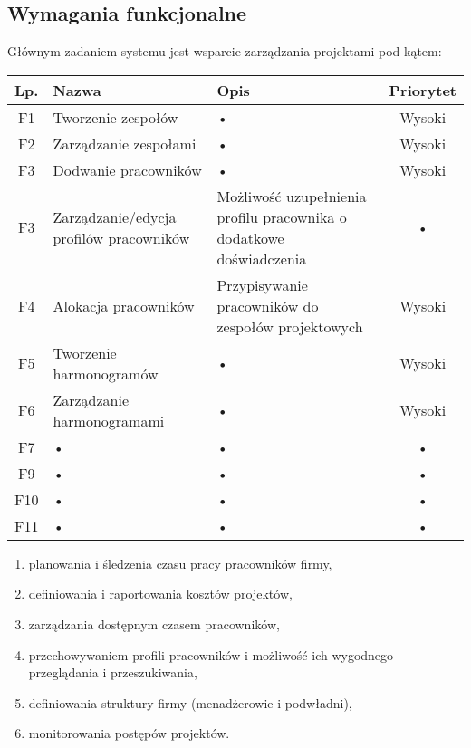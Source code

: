 \subsection{Wymagania funkcjonalne}
Głównym zadaniem systemu jest wsparcie zarządzania projektami pod kątem:

\begin{tabularx}{\textwidth}{|c|X|X|c|}
\hline 
Lp. & Nazwa & Opis & Priorytet \\ 
\hline 
F1 & Tworzenie zespołów & • & Wysoki \\ 
\hline 
F2 & Zarządzanie zespołami & • & Wysoki \\ 
\hline 
F3 & Dodwanie pracowników & • & Wysoki \\ 
\hline 
F3 & Zarządzanie/edycja profilów pracowników & Możliwość uzupełnienia profilu pracownika o dodatkowe doświadczenia & • \\ 
\hline 
F4 & Alokacja pracowników & Przypisywanie pracowników do zespołów projektowych & Wysoki \\ 
\hline 
F5 & Tworzenie harmonogramów & • & Wysoki \\ 
\hline 
F6 & Zarządzanie harmonogramami & • & Wysoki \\ 
\hline 
F7 & • & • & • \\ 
\hline 
F9 & • & • & • \\ 
\hline 
F10 & • & • & • \\ 
\hline 
F11 & • & • & • \\ 
\hline 
\end{tabularx} 
\begin{enumerate}
\item planowania i śledzenia czasu pracy pracowników firmy,
\item definiowania i raportowania kosztów projektów,
\item zarządzania dostępnym czasem pracowników,
\item przechowywaniem profili pracowników i możliwość ich wygodnego przeglądania i przeszukiwania,
\item definiowania struktury firmy (menadżerowie i podwładni),
\item monitorowania postępów projektów.
\end{enumerate}